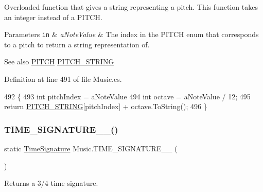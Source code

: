 Overloaded function that gives a string representing a pitch. This function takes an integer instead of a P\+I\+T\+CH. 


\begin{DoxyParams}[1]{Parameters}
\mbox{\tt in}  & {\em a\+Note\+Value} & The index in the P\+I\+T\+CH enum that corresponds to a pitch to return a string representation of.\\
\hline
\end{DoxyParams}
\begin{DoxySeeAlso}{See also}
\hyperlink{group___music_enums_ga508f69b199ea518f935486c990edac1d}{P\+I\+T\+CH} \hyperlink{group___music_constants_ga0f6eb5ac330d374c6b5021a0ba11c2bc}{P\+I\+T\+C\+H\+\_\+\+S\+T\+R\+I\+NG} 
\end{DoxySeeAlso}


Definition at line 491 of file Music.\+cs.


\begin{DoxyCode}
492     \{
493         \textcolor{keywordtype}{int} pitchIndex = aNoteValue %
494         \textcolor{keywordtype}{int} octave = aNoteValue / 12;
495         \textcolor{keywordflow}{return} \hyperlink{group___music_constants_ga0f6eb5ac330d374c6b5021a0ba11c2bc}{PITCH\_STRING}[pitchIndex] + octave.ToString();
496     \}
\end{DoxyCode}
\mbox{\label{group___music_stat_func_ga0392e239cbd45a23e5f76f88d0b4c152}} 
\subsubsection{\texorpdfstring{T\+I\+M\+E\+\_\+\+S\+I\+G\+N\+A\+T\+U\+R\+E\+\_\+\_()}{TIME\_SIGNATURE\_3\_4()}}
{\footnotesize\ttfamily static \hyperlink{group___music_structs_struct_music_1_1_time_signature}{Time\+Signature} Music.\+T\+I\+M\+E\+\_\+\+S\+I\+G\+N\+A\+T\+U\+R\+E\+\_\+\_ (\begin{DoxyParamCaption}{ }\end{DoxyParamCaption})\hspace{0.3cm}{\ttfamily [static]}}



Returns a 3/4 time signature. 



